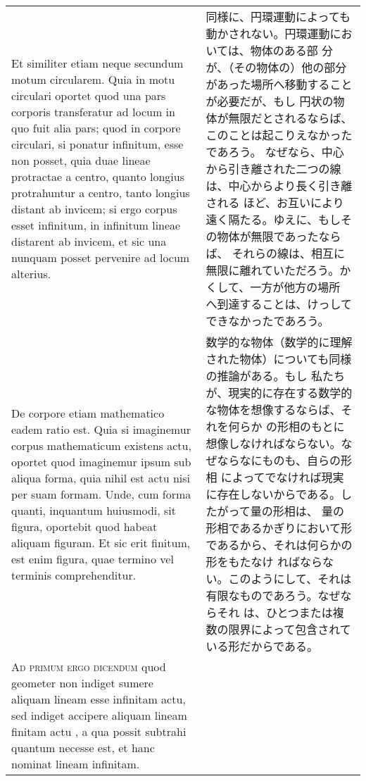 \documentclass[10pt]{jsarticle} %
\begin{document}
\begin{longtable}{p{21em}p{21em}}
\\


Et similiter etiam neque secundum motum circularem. Quia in motu
 circulari oportet quod una pars corporis transferatur ad locum in quo
 fuit alia pars; quod in corpore circulari, si ponatur infinitum, esse
 non posset, quia duae lineae protractae a centro, quanto longius
 protrahuntur a centro, tanto longius distant ab invicem; si ergo corpus
 esset infinitum, in infinitum lineae distarent ab invicem, et sic una
 nunquam posset pervenire ad locum alterius. 

&

同様に、円環運動によっても動かされない。円環運動においては、物体のある部
 分が、（その物体の）他の部分があった場所へ移動することが必要だが、もし
 円状の物体が無限だとされるならば、このことは起こりえなかったであろう。
 なぜなら、中心から引き離された二つの線は、中心からより長く引き離される
 ほど、お互いにより遠く隔たる。ゆえに、もしその物体が無限であったならば、
 それらの線は、相互に無限に離れていただろう。かくして、一方が他方の場所
 へ到達することは、けっしてできなかったであろう。



\\


De corpore etiam mathematico eadem ratio est. Quia si imaginemur corpus
 mathematicum existens actu, oportet quod imaginemur ipsum sub aliqua
 forma, quia nihil est actu nisi per suam formam. Unde, cum forma
 quanti, inquantum huiusmodi, sit figura, oportebit quod habeat aliquam
 figuram. Et sic erit finitum, est enim figura, quae termino vel
 terminis comprehenditur.

&

数学的な物体（数学的に理解された物体）についても同様の推論がある。もし
 私たちが、現実的に存在する数学的な物体を想像するならば、それを何らか
 の形相のもとに想像しなければならない。なぜならなにものも、自らの形相
 によってでなければ現実に存在しないからである。したがって量の形相は、
 量の形相であるかぎりにおいて形であるから、それは何らかの形をもたなけ
 ればならない。このようにして、それは有限なものであろう。なぜならそれ
 は、ひとつまたは複数の限界によって包含されている形だからである。


\\


{\scshape Ad primum ergo dicendum} quod geometer  non indiget sumere aliquam lineam
 esse infinitam actu, sed indiget accipere aliquam lineam finitam actu ,
 a qua possit subtrahi quantum necesse est, et hanc nominat lineam
 infinitam.


\end{longtable}
\end{document}
